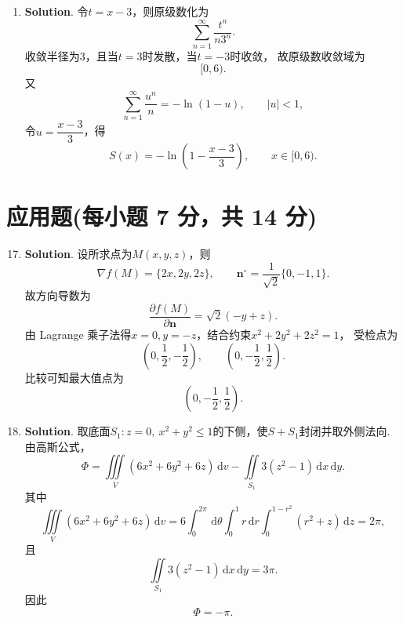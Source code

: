 \documentclass[../Main.tex]{subfiles}
\begin{document}
\begin{enumerate}
  \item \textbf{Solution}. 令$t=x-3$，则原级数化为
        \[
          \sum_{n=1}^{\infty}\frac{t^{n}}{n3^{n}}.
        \]
        收敛半径为$3$，且当$t=3$时发散，当$t=-3$时收敛，
        故原级数收敛域为
        \[
          [0,6).
        \]
        又
        \[
          \sum_{n=1}^{\infty}\frac{u^{n}}{n}=-\ln(1-u),\qquad |u|<1,
        \]
        令$u=\dfrac{x-3}{3}$，得
        \[
          S(x)=-\ln\left(1-\frac{x-3}{3}\right),\qquad x\in[0,6).
        \]
\end{enumerate}

\section{应用题(每小题 7 分，共 14 分)}
\begin{enumerate}
  \setcounter{enumi}{16}
  \item \textbf{Solution}. 设所求点为$M(x,y,z)$，则
        \[
          \nabla f(M)=\{2x,2y,2z\},\qquad \boldsymbol{n}^{\circ}=\frac{1}{\sqrt2}\{0,-1,1\}.
        \]
        故方向导数为
        \[
          \frac{\partial f(M)}{\partial \boldsymbol{n}}=\sqrt2(-y+z).
        \]
        由 Lagrange 乘子法得$x=0,y=-z$，结合约束$x^{2}+2y^{2}+2z^{2}=1$，
        受检点为
        \[
          \left(0,\frac12,-\frac12\right),\qquad \left(0,-\frac12,\frac12\right).
        \]
        比较可知最大值点为
        \[
          \left(0,-\frac12,\frac12\right).
        \]

  \item \textbf{Solution}. 取底面$S_{1}:z=0,\ x^{2}+y^{2}\leq1$的下侧，使$S+S_{1}$封闭并取外侧法向.
        由高斯公式，
        \[
          \Phi=\iiint\limits_{V}(6x^{2}+6y^{2}+6z)\,\mathrm{d}v-\iint\limits_{S_{1}}3(z^{2}-1)\,\mathrm{d}x\,\mathrm{d}y.
        \]
        其中
        \[
          \iiint\limits_{V}(6x^{2}+6y^{2}+6z)\,\mathrm{d}v
          =6\int_{0}^{2\pi}\,\mathrm{d}\theta\int_{0}^{1}r\,\mathrm{d}r\int_{0}^{1-r^{2}}(r^{2}+z)\,\mathrm{d}z
          =2\pi,
        \]
        且
        \[
          \iint\limits_{S_{1}}3(z^{2}-1)\,\mathrm{d}x\,\mathrm{d}y=3\pi.
        \]
        因此
        \[
          \Phi=-\pi.
        \]
\end{enumerate}
\end{document}
